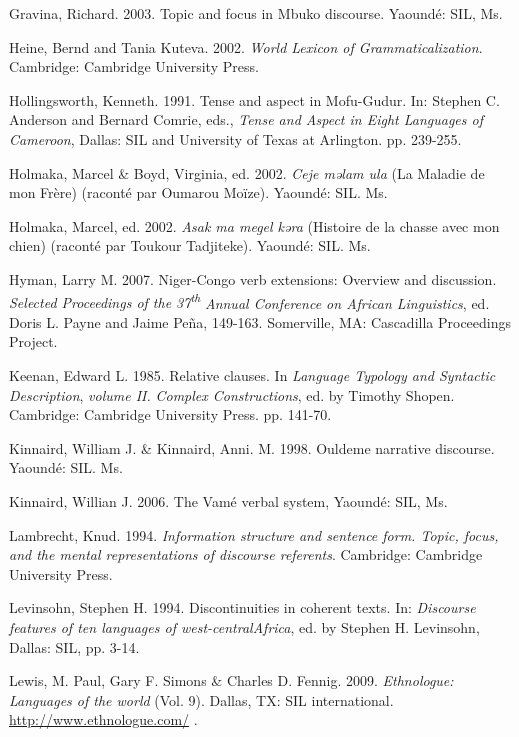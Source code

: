 \begin{styleTableheader}
Gravina, Richard. 2003. Topic and focus in Mbuko discourse. Yaoundé: SIL, Ms.
\end{styleTableheader}

Heine, Bernd and Tania Kuteva. 2002. \textit{World Lexicon of Grammaticalization}. Cambridge: Cambridge University Press.

Hollingsworth, Kenneth. 1991.  Tense and aspect in Mofu-Gudur.  In: Stephen C. Anderson and Bernard Comrie, eds., \textit{Tense and Aspect in Eight Languages of Cameroon}, Dallas:  SIL and University of Texas at Arlington.  pp. 239-255.

Holmaka, Marcel \& Boyd, Virginia, ed. 2002.  \textit{Ceje m}\textit{ə}\textit{lam ula} (La Maladie de mon Frère) (raconté par Oumarou Moïze).  Yaoundé: SIL. Ms.

Holmaka, Marcel, ed. 2002.  \textit{Asak ma megel k}\textit{ə}\textit{ra }(Histoire de la chasse avec mon chien) (raconté par Toukour Tadjiteke). Yaoundé: SIL. Ms.

Hyman, Larry M. 2007. Niger-Congo verb extensions: Overview and discussion. \textit{Selected Proceedings of the 37}\textit{\textsuperscript{th}}\textit{ Annual Conference on African Linguistics}, ed. Doris L. Payne and Jaime Peña, 149-163. Somerville, MA: Cascadilla Proceedings Project. 

\begin{styleReferences}
Keenan, Edward L. 1985. Relative clauses. In \textit{Language Typology and Syntactic Description}, \textit{volume II.}\textit{ Complex Constructions}, ed. by Timothy Shopen. Cambridge: Cambridge University Press. pp. 141-70.
\end{styleReferences}

Kinnaird, William J. \& Kinnaird, Anni. M. 1998. Ouldeme narrative discourse. Yaoundé:  SIL. Ms.

Kinnaird, Willian J. 2006. The Vamé verbal system, Yaoundé: SIL, Ms. 

Lambrecht, Knud. 1994. \textit{Information structure and sentence form. Topic, focus, and the mental representations of discourse referents}. Cambridge: Cambridge University Press.

Levinsohn, Stephen H. 1994. Discontinuities in coherent texts. In: \textit{Discourse features of ten languages of west-centralAfrica}, ed. by Stephen H. Levinsohn, Dallas: SIL, pp. 3-14.

Lewis, M. Paul, Gary F. Simons \& Charles D. Fennig. 2009. \textit{Ethnologue: Languages of the world} (Vol. 9). Dallas, TX: SIL international.  \href{http://www.ethnologue.com/show_family.asp?subid=90341}{http://www.ethnologue.com/} .

